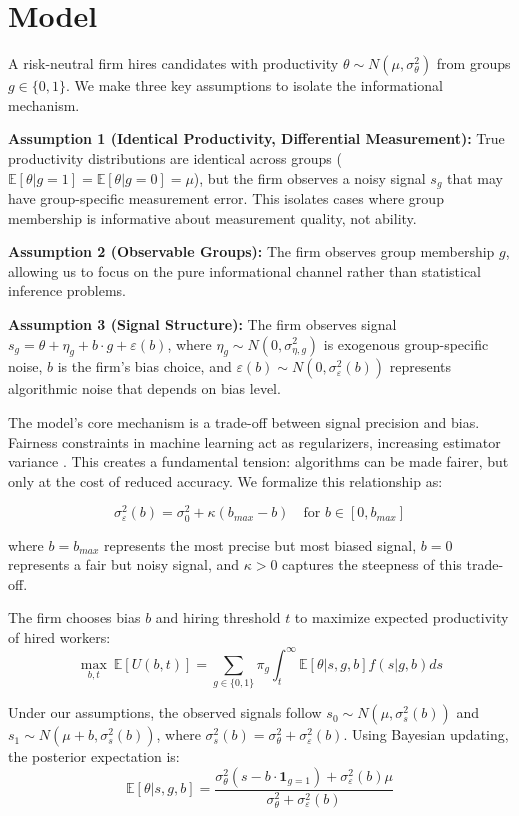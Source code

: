 \section{Model}

A risk-neutral firm hires candidates with productivity $\theta \sim N(\mu, \sigma_\theta^2)$ from groups $g \in \{0, 1\}$. We make three key assumptions to isolate the informational mechanism.

\textbf{Assumption 1 (Identical Productivity, Differential Measurement):} True productivity distributions are identical across groups ($\mathbb{E}[\theta|g=1] = \mathbb{E}[\theta|g=0] = \mu$), but the firm observes a noisy signal $s_g$ that may have group-specific measurement error. This isolates cases where group membership is informative about measurement quality, not ability.

\textbf{Assumption 2 (Observable Groups):} The firm observes group membership $g$, allowing us to focus on the pure informational channel rather than statistical inference problems.

\textbf{Assumption 3 (Signal Structure):} The firm observes signal $s_g = \theta + \eta_g + b \cdot g + \varepsilon(b)$, where $\eta_g \sim N(0, \sigma_{\eta,g}^2)$ is exogenous group-specific noise, $b$ is the firm's bias choice, and $\varepsilon(b) \sim N(0, \sigma_\varepsilon^2(b))$ represents algorithmic noise that depends on bias level.

The model's core mechanism is a trade-off between signal precision and bias. Fairness constraints in machine learning act as regularizers, increasing estimator variance \citet{Kamishima2012,Wick2019}. This creates a fundamental tension: algorithms can be made fairer, but only at the cost of reduced accuracy. We formalize this relationship as:

\begin{equation}
\sigma_\varepsilon^2(b) = \sigma_0^2 + \kappa(b_{max} - b) \quad \text{for } b \in [0, b_{max}]
\end{equation}

where $b=b_{max}$ represents the most precise but most biased signal, $b=0$ represents a fair but noisy signal, and $\kappa > 0$ captures the steepness of this trade-off.

The firm chooses bias $b$ and hiring threshold $t$ to maximize expected productivity of hired workers:
\begin{equation}
\max_{b, t} \ \mathbb{E}[U(b,t)] = \sum_{g \in \{0,1\}} \pi_g \int_t^\infty \mathbb{E}[\theta | s, g, b] f(s|g, b) ds
\end{equation}

Under our assumptions, the observed signals follow $s_0 \sim N(\mu, \sigma_s^2(b))$ and $s_1 \sim N(\mu + b, \sigma_s^2(b))$, where $\sigma_s^2(b) = \sigma_\theta^2 + \sigma_\varepsilon^2(b)$. Using Bayesian updating, the posterior expectation is:
\begin{equation}
\mathbb{E}[\theta | s, g, b] = \frac{\sigma_\theta^2 (s - b \cdot \mathbf{1}_{g=1}) + \sigma_\varepsilon^2(b) \mu}{\sigma_\theta^2 + \sigma_\varepsilon^2(b)}
\end{equation}
